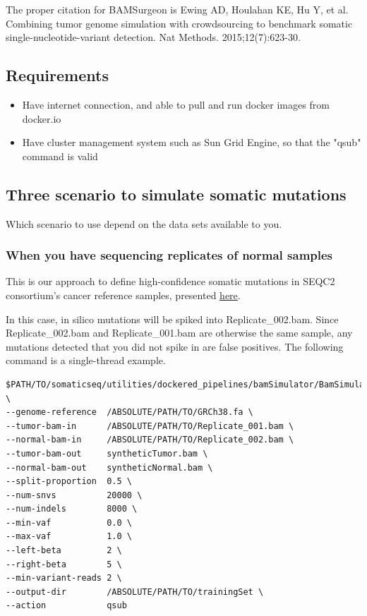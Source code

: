 \documentclass[10pt,letterpaper]{article}
\begin{document}
\begin{sloppypar}
The proper citation for BAMSurgeon is Ewing AD, Houlahan KE, Hu Y, et al. Combining tumor genome simulation with crowdsourcing to benchmark somatic single-nucleotide-variant detection. Nat Methods. 2015;12(7):623-30.


\subsection{Requirements}

\begin{itemize}

  \item Have internet connection, and able to pull and run docker images from docker.io

  \item Have cluster management system such as Sun Grid Engine, so that the "qsub" command is valid

\end{itemize}





\subsection{Three scenario to simulate somatic mutations}

Which scenario to use depend on the data sets available to you.


\subsubsection{When you have sequencing replicates of normal samples}

This is our approach to define high-confidence somatic mutations in SEQC2 consortium's cancer reference samples, presented \href{https://dx.doi.org/10.1158/1538-7445.AM2018-432}{here}.

In this case, in silico mutations will be spiked into Replicate\_002.bam. Since Replicate\_002.bam and Replicate\_001.bam are otherwise the same sample, any mutations detected that you did not spike in are false positives. The following command is a single-thread example.


\begin{lstlisting}
$PATH/TO/somaticseq/utilities/dockered_pipelines/bamSimulator/BamSimulator_singleThread.sh \
--genome-reference  /ABSOLUTE/PATH/TO/GRCh38.fa \
--tumor-bam-in      /ABSOLUTE/PATH/TO/Replicate_001.bam \
--normal-bam-in     /ABSOLUTE/PATH/TO/Replicate_002.bam \
--tumor-bam-out     syntheticTumor.bam \
--normal-bam-out    syntheticNormal.bam \
--split-proportion  0.5 \
--num-snvs          20000 \
--num-indels        8000 \
--min-vaf           0.0 \
--max-vaf           1.0 \
--left-beta         2 \
--right-beta        5 \
--min-variant-reads 2 \
--output-dir        /ABSOLUTE/PATH/TO/trainingSet \
--action            qsub
\end{lstlisting}




\end{sloppypar}
\end{document}

